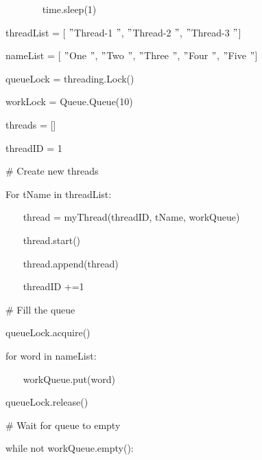 \documentclass{wileySix}
\begin{document}
\begin{myEnumerate}
\noindent 
{\fontsize{10pt}{10pt}\selectfont ~~~~~~~ time.sleep(1)} \par
\vspace{12pt}
\noindent 
{\fontsize{10pt}{10pt}\selectfont threadList = [ $ " $Thread-1 $ " $,  $ " $Thread-2 $ " $,  $ " $Thread-3 $ " $]} \par
\noindent 
{\fontsize{10pt}{10pt}\selectfont nameList = [ $ " $One $ " $,  $ " $Two $ " $,  $ " $Three $ " $,  $ " $Four $ " $,  $ " $Five $ " $]} \par
\noindent 
{\fontsize{10pt}{10pt}\selectfont queueLock = threading.Lock()} \par
\noindent 
{\fontsize{10pt}{10pt}\selectfont workLock = Queue.Queue(10)} \par
\noindent 
{\fontsize{10pt}{10pt}\selectfont threads = []} \par
\noindent 
{\fontsize{10pt}{10pt}\selectfont threadID = 1} \par
\vspace{10pt}
\noindent 
{\fontsize{10pt}{10pt}\selectfont  $  \#  $ Create new threads} \par
\noindent 
{\fontsize{10pt}{10pt}\selectfont For tName in threadList:} \par
\noindent 
{\fontsize{10pt}{10pt}\selectfont ~~~ thread = myThread(threadID, tName, workQueue)} \par
\noindent 
{\fontsize{10pt}{10pt}\selectfont ~~~ thread.start()} \par
\noindent 
{\fontsize{10pt}{10pt}\selectfont ~~~ thread.append(thread)} \par
\noindent 
{\fontsize{10pt}{10pt}\selectfont ~~~ threadID +=1} \par
\vspace{10pt}
\noindent 
{\fontsize{10pt}{10pt}\selectfont  $  \#  $ Fill the queue} \par
\noindent 
{\fontsize{10pt}{10pt}\selectfont queueLock.acquire()} \par
\noindent 
{\fontsize{10pt}{10pt}\selectfont for word in nameList:} \par
\noindent 
{\fontsize{10pt}{10pt}\selectfont ~~~ workQueue.put(word)} \par
\noindent 
{\fontsize{10pt}{10pt}\selectfont queueLock.release()} \par
\vspace{10pt}
\noindent 
{\fontsize{10pt}{10pt}\selectfont  $  \#  $ Wait for queue to empty} \par
\noindent 
{\fontsize{10pt}{10pt}\selectfont while not workQueue.empty():} \par

\end{myEnumerate}
\end{document}
